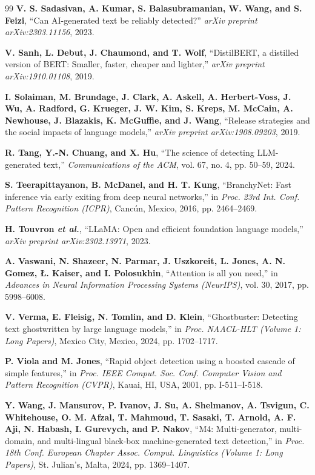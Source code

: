 \begin{thebibliography}{99}
\textbf{V. S. Sadasivan, A. Kumar, S. Balasubramanian, W. Wang, and S. Feizi}, ``Can AI-generated text be reliably detected?'' \textit{arXiv preprint arXiv:2303.11156}, 2023.

\textbf{V. Sanh, L. Debut, J. Chaumond, and T. Wolf}, ``DistilBERT, a distilled version of BERT: Smaller, faster, cheaper and lighter,'' \textit{arXiv preprint arXiv:1910.01108}, 2019.

\textbf{I. Solaiman, M. Brundage, J. Clark, A. Askell, A. Herbert-Voss, J. Wu, A. Radford, G. Krueger, J. W. Kim, S. Kreps, M. McCain, A. Newhouse, J. Blazakis, K. McGuffie, and J. Wang}, ``Release strategies and the social impacts of language models,'' \textit{arXiv preprint arXiv:1908.09203}, 2019.

\textbf{R. Tang, Y.-N. Chuang, and X. Hu}, ``The science of detecting LLM-generated text,'' \textit{Communications of the ACM}, vol. 67, no. 4, pp. 50--59, 2024.

\textbf{S. Teerapittayanon, B. McDanel, and H. T. Kung}, ``BranchyNet: Fast inference via early exiting from deep neural networks,'' in \textit{Proc. 23rd Int. Conf. Pattern Recognition (ICPR)}, Canc\'{u}n, Mexico, 2016, pp. 2464--2469.

\textbf{H. Touvron \textit{et al.}}, ``LLaMA: Open and efficient foundation language models,'' \textit{arXiv preprint arXiv:2302.13971}, 2023.

\textbf{A. Vaswani, N. Shazeer, N. Parmar, J. Uszkoreit, L. Jones, A. N. Gomez, {\L}. Kaiser, and I. Polosukhin}, ``Attention is all you need,'' in \textit{Advances in Neural Information Processing Systems (NeurIPS)}, vol. 30, 2017, pp. 5998--6008.

\textbf{V. Verma, E. Fleisig, N. Tomlin, and D. Klein}, ``Ghostbuster: Detecting text ghostwritten by large language models,'' in \textit{Proc. NAACL-HLT (Volume 1: Long Papers)}, Mexico City, Mexico, 2024, pp. 1702--1717.

\textbf{P. Viola and M. Jones}, ``Rapid object detection using a boosted cascade of simple features,'' in \textit{Proc. IEEE Comput. Soc. Conf. Computer Vision and Pattern Recognition (CVPR)}, Kauai, HI, USA, 2001, pp. I-511--I-518.

\textbf{Y. Wang, J. Mansurov, P. Ivanov, J. Su, A. Shelmanov, A. Tsvigun, C. Whitehouse, O. M. Afzal, T. Mahmoud, T. Sasaki, T. Arnold, A. F. Aji, N. Habash, I. Gurevych, and P. Nakov}, ``M4: Multi-generator, multi-domain, and multi-lingual black-box machine-generated text detection,'' in \textit{Proc. 18th Conf. European Chapter Assoc. Comput. Linguistics (Volume 1: Long Papers)}, St. Julian's, Malta, 2024, pp. 1369--1407.


\end{thebibliography}
